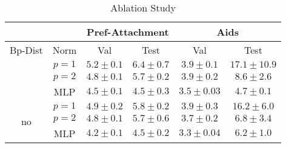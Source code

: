 \begin{table}[htbp]
    \addtolength{\tabcolsep}{-1pt}
    \fontsize{9pt}{10.25pt}\selectfont
    \centering
    \renewcommand{\arraystretch}{1.2}
    \begin{tabular}{|c|c|c|c|c|c|}
        \hline
        \multicolumn{2}{|c|}{} & \multicolumn{2}{c|}{Pref-Attachment} & \multicolumn{2}{c|}{Aids} \\ \hline
        Bp-Dist & Norm & Val & Test & Val & Test \\ \hhline{|=|=|=|=|=|=|}
        \multirow{3}{*}{yes} & $p=1$ & $5.2 \pm 0.1$ & $6.4 \pm 0.7$ & $3.9 \pm 0.1$ & $17.1 \pm 10.9$ \\ \hhline{|~|-|-|-|-|-|}
        & $p=2$ & $4.8 \pm 0.1$ & $5.7 \pm 0.2$ & $3.9 \pm 0.2$ & $8.6 \pm 2.6$ \\ \hhline{|~|-|-|-|-|-|}
        & MLP & $4.5 \pm 0.1$ & $4.5 \pm 0.3$ & $3.5 \pm 0.03$ & $4.7 \pm 0.1$ \\ \hline
        \multirow{3}{*}{no}  & $p=1$ & $4.9 \pm 0.2$ & $5.8 \pm 0.2$ & $3.9 \pm 0.3$ & $16.2 \pm 6.0$ \\ \hhline{|~|-|-|-|-|-|}
        & $p=2$ & $4.8 \pm 0.1$ & $5.7 \pm 0.6$ & $3.7 \pm 0.2$ & $6.8 \pm 3.4$ \\ \hhline{|~|-|-|-|-|-|}
        & MLP & $4.2 \pm 0.1$ & $4.5 \pm 0.2$ & $3.3 \pm 0.04$ & $6.2 \pm 1.0$ \\ \hline
    \end{tabular}
    \caption{Ablation Study}
    \label{tab:ex1-ablation}
\end{table}



